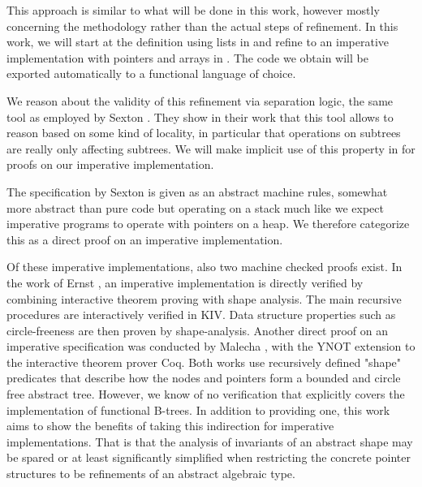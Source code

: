 This approach is similar to what will be done in this work,
however mostly concerning the methodology rather than the actual
steps of refinement.
In this work, we will start at the definition using lists in 
and refine to an imperative implementation with pointers and arrays in .
The code we obtain will be exported automatically to a functional language of choice.

We reason about the validity of this refinement via separation logic,
the same tool as employed by Sexton \parencite{DBLP:journals/entcs/SextonT08}.
They show in their work that this tool allows to reason based on some kind of locality,
in particular that operations on subtrees are really only affecting subtrees.
We will make implicit use of this property in 
for proofs on our imperative implementation.

The specification by Sexton is given as an abstract machine rules,
somewhat more abstract than pure code but operating on a stack
much like we expect imperative programs to operate with pointers on a heap.
We therefore categorize this as a direct proof on an imperative implementation.

Of these imperative implementations, also two machine checked proofs exist.
In the work of Ernst \parencite{DBLP:journals/sosym/ErnstSR15},
an imperative implementation is directly verified
by combining interactive theorem proving 
with shape analysis.
The main recursive procedures are interactively verified in KIV.
Data structure properties such as circle-freeness are then proven by shape-analysis.
Another direct proof on an imperative specification 
was conducted by Malecha \parencite{DBLP:conf/popl/MalechaMSW10}, with the YNOT
extension to the interactive theorem prover Coq.
Both works use recursively defined "shape" predicates
that describe how the nodes and pointers
form a bounded and circle free abstract tree.
However, we know of no verification that explicitly covers
the implementation of functional B-trees.
In addition to providing one, this work aims to show the benefits
of taking this indirection for imperative implementations.
That is that the analysis of invariants of an abstract shape may be spared
or at least significantly simplified when
restricting the concrete pointer structures to be refinements
of an abstract algebraic type.